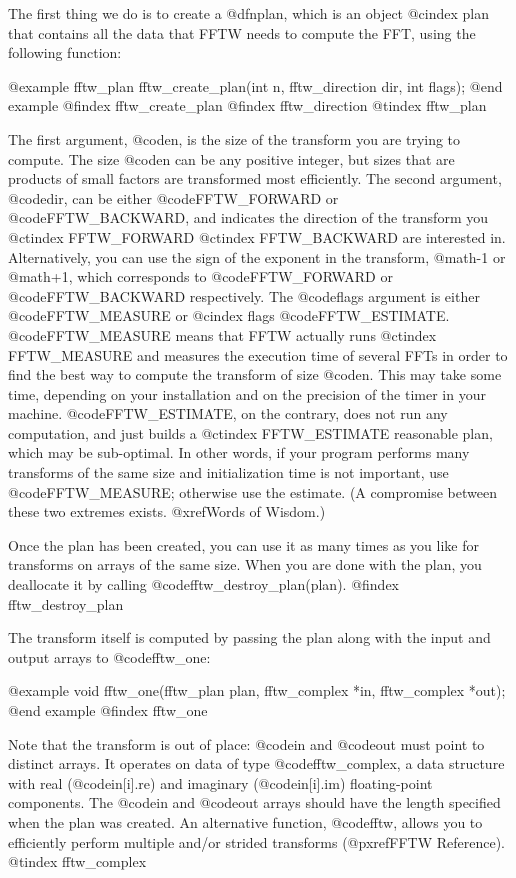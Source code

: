 The first thing we do is to create a @dfn{plan}, which is an object
@cindex plan
that contains all the data that FFTW needs to compute the FFT, using the
following function:

@example
fftw_plan fftw_create_plan(int n, fftw_direction dir, int flags);
@end example
@findex fftw_create_plan
@findex fftw_direction
@tindex fftw_plan

The first argument, @code{n}, is the size of the transform you are
trying to compute.  The size @code{n} can be any positive integer, but
sizes that are products of small factors are transformed most
efficiently.  The second argument, @code{dir}, can be either
@code{FFTW_FORWARD} or @code{FFTW_BACKWARD}, and indicates the direction
of the transform you
@ctindex FFTW_FORWARD
@ctindex FFTW_BACKWARD
are interested in.  Alternatively, you can use the sign of the exponent
in the transform, @math{-1} or @math{+1}, which corresponds to
@code{FFTW_FORWARD} or @code{FFTW_BACKWARD} respectively.  The
@code{flags} argument is either @code{FFTW_MEASURE} or
@cindex flags
@code{FFTW_ESTIMATE}.  @code{FFTW_MEASURE} means that FFTW actually runs
@ctindex FFTW_MEASURE
and measures the execution time of several FFTs in order to find the
best way to compute the transform of size @code{n}.  This may take some
time, depending on your installation and on the precision of the timer
in your machine.  @code{FFTW_ESTIMATE}, on the contrary, does not run
any computation, and just builds a
@ctindex FFTW_ESTIMATE
reasonable plan, which may be sub-optimal.  In other words, if your
program performs many transforms of the same size and initialization
time is not important, use @code{FFTW_MEASURE}; otherwise use the
estimate.  (A compromise between these two extremes exists.  @xref{Words
of Wisdom}.)

Once the plan has been created, you can use it as many times as you like
for transforms on arrays of the same size.  When you are done with the
plan, you deallocate it by calling @code{fftw_destroy_plan(plan)}.
@findex fftw_destroy_plan

The transform itself is computed by passing the plan along with the
input and output arrays to @code{fftw_one}:

@example
void fftw_one(fftw_plan plan, fftw_complex *in, fftw_complex *out);
@end example
@findex fftw_one

Note that the transform is out of place: @code{in} and @code{out} must
point to distinct arrays. It operates on data of type
@code{fftw_complex}, a data structure with real (@code{in[i].re}) and
imaginary (@code{in[i].im}) floating-point components.  The @code{in}
and @code{out} arrays should have the length specified when the plan was
created.  An alternative function, @code{fftw}, allows you to
efficiently perform multiple and/or strided transforms (@pxref{FFTW
Reference}).
@tindex fftw_complex

